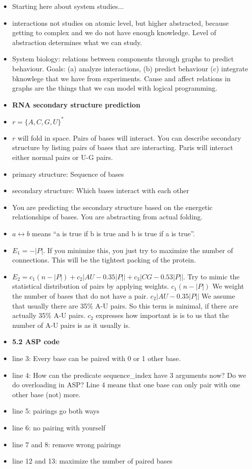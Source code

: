 \documentclass[runningheads]{llncs}
\begin{document}
\begin{itemize}
    \item Starting here about system studies...
    \item interactions not studies on atomic level, but higher abstracted, because getting to complex and we do not have enough knowledge. Level of abstraction determines what we can study. 
    \item System biology: relations between components through graphs to predict behaviour. Goals: (a) analyze interactions, (b) predict behaviour (c) integrate bknowlege that we have from experiments. Cause and affect relations in graphs are the things that we can model with logical programming. 
    
    
    \item \textbf{RNA secondary structure prediction}
    \item $r = \{A,C,G,U\}^*$
    \item $r$ will fold in space. Pairs of bases will interact. You can describe secondary structure by listing pairs of bases that are interacting. Paris will interact either normal pairs or U-G pairs. 
    \item primary structure: Sequence of bases
    \item secondary structure: Which bases interact with each other
    \item You are predicting the secondary structure based on the energetic relationships of bases. You are abstracting from actual folding.
    \item $a \leftrightarrow b$ means ``a is true if b is true and b is true if a is true''.
    \item $E_1 = -|P|$. If you minimize this, you just try to maximize the number of connections. This will be the tightest packing of the protein.  
    \item $E_2 = c_1(n-|P|) + c_2|AU - 0.35|P|| + c_3|CG - 0.53|P||$. Try to mimic the statistical distribution of pairs by applying weights. $c_1(n-|P|)$ We weight the number of bases that do not have a pair. $c_2|AU - 0.35|P||$ We assume that usually there are 35\% A-U pairs. So this term is minimal, if there are actually 35\% A-U pairs. $c_2$ expresses how important is is to us that the number of A-U pairs is as it usually is. 
    \item \textbf{5.2 ASP code}
    \item line 3: Every base can be paired with 0 or 1 other base. 
    \item line 4: How can the predicate sequence\_index have 3 arguments now? Do we do overloading in ASP? Line 4 means that one base can only pair with one other base (not) more.
    \item line 5: pairings go both ways
    \item line 6: no pairing with yourself
    \item line 7 and 8: remove wrong pairings
    \item line 12 and 13: maximize the number of paired bases
    

\end{itemize}
\end{document}
